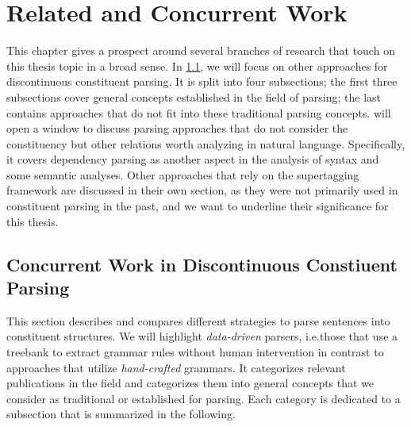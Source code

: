 \documentclass[../document.tex]{subfiles}
\begin{document}
    \chapter{Related and Concurrent Work}\label{sec:literature}
    This chapter gives a prospect around several branches of research that touch on this thesis topic in a broad sense.
    In \cref{sec:literature:constituency}, we will focus on other approaches for discontinuous constituent parsing.
    It is split into four subsections; the first three subsections cover general concepts established in the field of parsing; the last contains approaches that do not fit into these traditional parsing concepts.
     will open a window to discuss parsing approaches that do not consider the constituency but other relations worth analyzing in natural language.
    Specifically, it covers dependency parsing as another aspect in the analysis of syntax and some semantic analyses.
    Other approaches that rely on the supertagging framework are discussed in their own section, as they were not primarily used in constituent parsing in the past, and we want to underline their significance for this thesis.

    \section{Concurrent Work in Discontinuous Constiuent Parsing}\label{sec:literature:constituency}
    This section describes and compares different strategies to parse sentences into constituent structures.
    We will highlight \emph{data-driven} parsers, i.e.\@ those that use a treebank to extract grammar rules without human intervention \citep[c.f.\@ Section 1.1]{Kal10} in contrast to approaches that utilize \emph{hand-crafted} grammars.
    It categorizes relevant publications in the field and categorizes them into general concepts that we consider as traditional or established for parsing.
    Each category is dedicated to a subsection that is summarized in the following.
    
\end{document}
